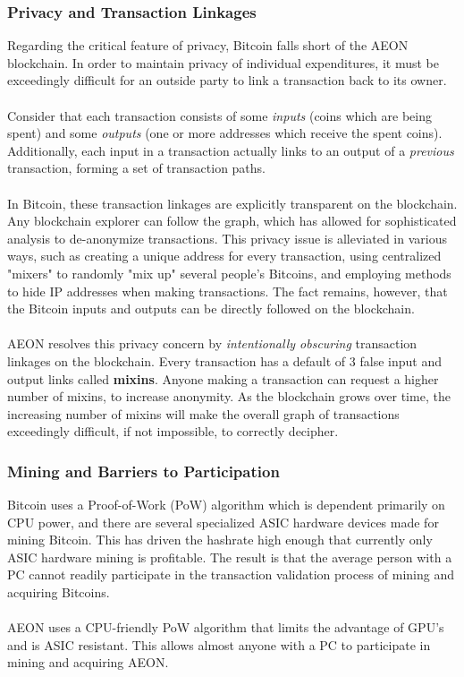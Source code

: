 \subsubsection{Privacy and Transaction Linkages}
Regarding the critical feature of privacy, Bitcoin falls short of the AEON blockchain. In order to maintain privacy of individual expenditures, it must be exceedingly difficult for an outside party to link a transaction back to its owner.\\
\\
Consider that each transaction consists of some \textit{inputs} (coins which are being spent) and some \textit{outputs} (one or more addresses which receive the spent coins).  Additionally, each input in a transaction actually links to an output of a \textit{previous} transaction, forming a set of transaction paths.\\
\\
In Bitcoin, these transaction linkages are explicitly transparent on the blockchain. Any blockchain explorer can follow the graph, which has allowed for sophisticated analysis to de-anonymize transactions. This privacy issue is alleviated in various ways, such as creating a unique address for every transaction, using centralized "mixers" to randomly "mix up" several people's Bitcoins, and employing methods to hide IP addresses when making transactions.  The fact remains, however, that the Bitcoin inputs and outputs can be directly followed on the blockchain.\\
\\
AEON resolves this privacy concern by \textit{intentionally obscuring} transaction linkages on the blockchain. Every transaction has a default of 3 false input and output links called \textbf{mixins}. Anyone making a transaction can request a higher number of mixins, to increase anonymity.  As the blockchain grows over time, the increasing number of mixins will make the overall graph of transactions exceedingly difficult, if not impossible, to correctly decipher.

\subsubsection{Mining and Barriers to Participation}
Bitcoin uses a Proof-of-Work (PoW) algorithm which is dependent primarily on CPU power, and there are several specialized ASIC hardware devices made for mining Bitcoin. This has driven the hashrate high enough that currently only ASIC hardware mining is profitable.  The result is that the average person with a PC cannot readily participate in the transaction validation process of mining and acquiring Bitcoins.\\
\\
AEON uses a CPU-friendly PoW algorithm that limits the advantage of GPU’s and is ASIC resistant. This allows almost anyone with a PC to participate in mining and acquiring AEON. 

